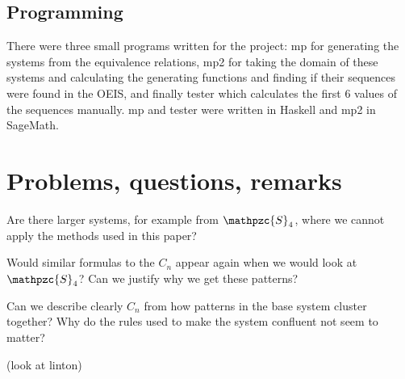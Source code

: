 \documentclass[a4paper, 11pt]{article}
\theoremstyle{definition}
\newcommand{\Sym}{\mathpzc{S}}
\begin{document}
\subsection{Programming}
There were three small programs written for the project: mp for generating the
systems from the equivalence relations, mp2 for taking the domain of these
systems and calculating the generating functions and finding if their sequences
were found in the OEIS, and finally tester which calculates the first 6 values
of the sequences manually. mp and tester were written in Haskell and mp2 in SageMath. 


\section{Problems, questions, remarks}
Are there larger systems, for example from $\Sym_4$, where we cannot apply the
methods used in this paper?

Would similar formulas to the $C_n$ appear again when we would
look at $\Sym_4$? Can we justify why we get these patterns?

Can we describe clearly $C_n$ from how patterns in the base system cluster together?
Why do the rules used to make the system confluent not seem to matter?

(look at linton)



\end{document}
